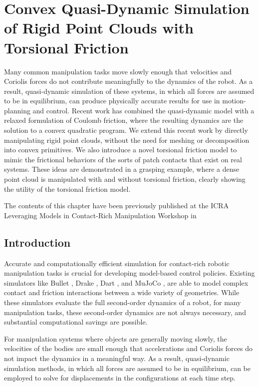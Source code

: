 \graphicspath{{quasidynamics/}}


\chapter{Convex Quasi-Dynamic Simulation of Rigid Point Clouds with Torsional Friction}
\label{sec:quasidynamics}

Many common manipulation tasks move slowly enough that velocities and Coriolis forces do not contribute meaningfully to the dynamics of the robot. As a result, quasi-dynamic simulation of these systems, in which all forces are assumed to be in equilibrium, can produce physically accurate results for use in motion-planning and control. Recent work has combined the quasi-dynamic model with a relaxed formulation of Coulomb friction, where the resulting dynamics are the solution to a convex quadratic program. We extend this recent work by directly manipulating rigid point clouds, without the need for meshing or decomposition into convex primitives. We also introduce a novel torsional friction model to mimic the frictional behaviors of the sorts of patch contacts that exist on real systems. These ideas are demonstrated in a grasping example, where a dense point cloud is manipulated with and without torsional friction, clearly showing the utility of the torsional friction model. 

The contents of this chapter have been previously published at the ICRA Leveraging Models in Contact-Rich Manipulation Workshop in \citet{tracy2023c}

\section{Introduction}


Accurate and computationally efficient simulation for contact-rich robotic manipulation tasks is crucial for developing model-based control policies. Existing simulators like Bullet \cite{coumans2015}, Drake \cite{tedrake2019a}, Dart \cite{lee2018}, and MuJoCo \cite{todorov2012a}, are able to model complex contact and friction interactions between a wide variety of geometries. While these simulators evaluate the full second-order dynamics of a robot, for many manipulation tasks, these second-order dynamics are not always necessary, and substantial computational savings are possible. 

For manipulation systems where objects are generally moving slowly, the velocities of the bodies are small enough that accelerations and Coriolis forces do not impact the dynamics in a meaningful way. As a result, quasi-dynamic \cite{mason2001} simulation methods, in which all forces are assumed to be in equilibrium, can be employed to solve for displacements in the configurations at each time step. 

